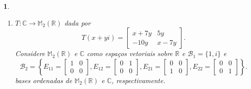 \documentclass[12pt]{exam}
\newtheorem{exercicio}{}
\newcommand{\real}{\mathbb{R}}
\newcommand{\complex}{\mathbb{C}}
\newcommand{\cp}[1]{\mathbb{#1}}
\begin{document}
\begin{exercicio}
\begin{enumerate}[label=({\alph*})]
    \item $T : \complex \to \cp{M}_2(\real)$ dada por
    \[
      T(x + yi) = \begin{bmatrix}
        x + 7y & 5y\\
        -10y & x - 7y
      \end{bmatrix}.
    \]
    Considere $\cp{M}_2(\real)$ e $\complex$ como espa\c{c}os vetoriais sobre $\real$ e $\mathcal{B}_1 = \{1, i\}$ e 
    \[
        \mathcal{B}_2 = \left\{E_{11} = \begin{bmatrix}
          1 & 0\\0 & 0
        \end{bmatrix}, E_{12} = \begin{bmatrix}
          0 & 1\\0 & 0
        \end{bmatrix}, E_{21} = \begin{bmatrix}
          0 & 0\\1 & 0
        \end{bmatrix}, E_{22} = \begin{bmatrix}
          0 & 0\\0 & 1
        \end{bmatrix}\right\}.
    \]
    bases ordenadas de $\cp{M}_2(\real)$ e $\complex$, respectivamente.


\end{enumerate}
\end{exercicio}
\end{document}

